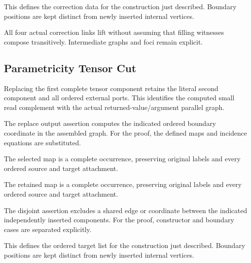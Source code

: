 This defines the correction data for the construction just described. Boundary positions are kept distinct from newly inserted internal vertices.
\par{}

All four actual correction links lift without assuming that filling witnesses compose transitively. Intermediate graphs and foci remain explicit.
\par{}

\subsection{Parametricity Tensor Cut}
Replacing the first complete tensor component retains the literal second component and all ordered external ports. This identifies the computed small read complement with the actual returned-value/argument parallel graph.

The replace output assertion computes the indicated ordered boundary coordinate in the assembled graph.
For the proof, the defined maps and incidence equations are substituted.
\par{}

The selected map is a complete occurrence, preserving original labels and every ordered source and target attachment.
\par{}

The retained map is a complete occurrence, preserving original labels and every ordered source and target attachment.
\par{}

The disjoint assertion excludes a shared edge or coordinate between the indicated independently inserted components.
For the proof, constructor and boundary cases are separated explicitly.
\par{}

This defines the ordered target list for the construction just described. Boundary positions are kept distinct from newly inserted internal vertices.
\par{}

